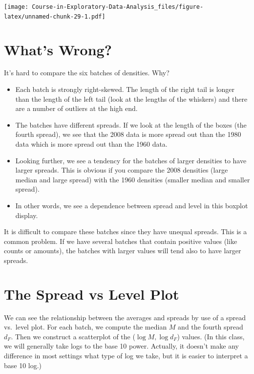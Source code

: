 \documentclass[
]{book}
\begin{document}
\texttt{[image: Course-in-Exploratory-Data-Analysis\_files/figure-latex/unnamed-chunk-29-1.pdf]}

\hypertarget{whats-wrong}{%
\section{What's Wrong?}\label{whats-wrong}}

It's hard to compare the six batches of densities. Why?

\begin{itemize}
\item
  Each batch is strongly right-skewed. The length of the right tail is longer than the length of the left tail (look at the lengths of the whiskers) and there are a number of outliers at the high end.
\item
  The batches have different spreads. If we look at the length of the boxes (the fourth spread), we see that the 2008 data is more spread out than the 1980 data which is more spread out than the 1960 data.
\item
  Looking further, we see a tendency for the batches of larger densities to have larger spreads. This is obvious if you compare the 2008 densities (large median and large spread) with the 1960 densities (smaller median and smaller spread).
\item
  In other words, we see a dependence between spread and level in this boxplot display.
\end{itemize}

It is difficult to compare these batches since they have unequal spreads. This is a common problem. If we have several batches that contain positive values (like counts or amounts), the batches with larger values will tend also to have larger spreads.

\hypertarget{the-spread-vs-level-plot}{%
\section{The Spread vs Level Plot}\label{the-spread-vs-level-plot}}

We can see the relationship between the averages and spreads by use of a spread vs.~level plot. For each batch, we compute the median \(M\) and the fourth spread \(d_F\). Then we construct a scatterplot of the (\(\log M, \log d_F\)) values. (In this class, we will generally take logs to the base 10 power. Actually, it doesn't make any difference in most settings what type of log we take, but it is easier to interpret a base 10 log.)
\end{document}

